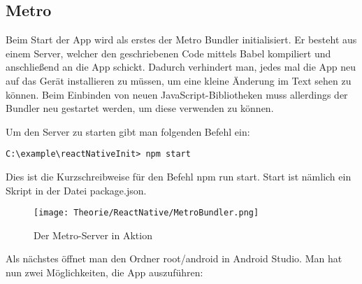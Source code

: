 

\subsection{Metro}
\label{metrobundler}
Beim Start der App wird als erstes der Metro Bundler initialisiert. Er besteht aus einem Server,
welcher den geschriebenen Code mittels Babel kompiliert und anschließend an die App schickt. Dadurch
verhindert man, jedes mal die App neu auf das Gerät installieren zu müssen, um eine kleine Änderung
im Text sehen zu können. Beim Einbinden von neuen JavaScript-Bibliotheken muss allerdings der
Bundler neu gestartet werden, um diese verwenden zu können.

Um den Server zu starten gibt man folgenden Befehl ein:

\begin{lstlisting}
C:\example\reactNativeInit> npm start
\end{lstlisting}

Dies ist die Kurzschreibweise für den Befehl npm run start. Start ist nämlich ein Skript in der
Datei package.json.

\begin{figure}[H]
  \begin{center}
    \texttt{[image: Theorie/ReactNative/MetroBundler.png]}
    \caption{Der Metro-Server in Aktion}
  \end{center}
\end{figure}

Als nächstes öffnet man den Ordner root/android in Android Studio. Man hat nun zwei Möglichkeiten,
die App auszuführen:


